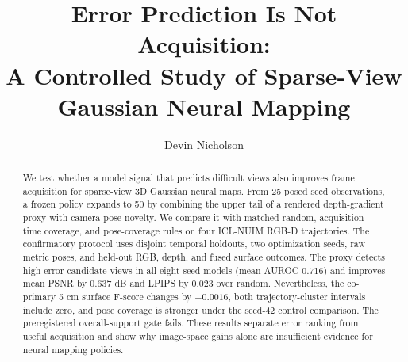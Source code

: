 \documentclass[10pt,twocolumn]{article}
\title{Error Prediction Is Not Acquisition:\\A Controlled Study of Sparse-View Gaussian Neural Mapping}
\author{Devin Nicholson}
\date{}
\begin{document}
\maketitle

\begin{abstract}
We test whether a model signal that predicts difficult views also improves
frame acquisition for sparse-view 3D Gaussian neural maps.  From 25 posed seed
observations, a frozen policy expands to 50 by combining the upper tail of a
rendered depth-gradient proxy with camera-pose novelty.  We compare it with
matched random, acquisition-time coverage, and pose-coverage rules on four
ICL-NUIM RGB-D trajectories.  The confirmatory protocol uses disjoint temporal
holdouts, two optimization seeds, raw metric poses, and held-out RGB, depth,
and fused surface outcomes.  The proxy detects high-error candidate views in
all eight seed models (mean AUROC 0.716) and improves mean PSNR by 0.637 dB and
LPIPS by 0.023 over random.  Nevertheless, the co-primary 5 cm surface F-score
changes by $-0.0016$, both trajectory-cluster intervals include zero, and pose
coverage is stronger under the seed-42 control comparison.  The preregistered
overall-support gate fails.  These results separate error ranking from useful
acquisition and show why image-space gains alone are insufficient evidence for
neural mapping policies.
\end{abstract}












\appendix

\end{document}
